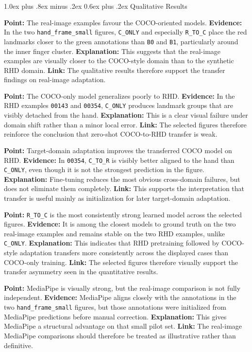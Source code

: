 \documentclass[10pt,letterpaper]{article}
\makeatletter
\renewcommand\subsection{\@startsection{subsection}{2}{\z@}%
  {1.0ex plus .8ex minus .2ex}%
  {0.6ex plus .2ex}%
  {\normalfont\itshape}}
\makeatother
\begin{document}
\subsection{Qualitative Results}

\medskip
\noindent\textbf{Point:} The real-image examples favour the COCO-oriented models.  
\textbf{Evidence:} In the two \texttt{hand\_frame\_small} figures, \texttt{C\_ONLY} and especially \texttt{R\_TO\_C} place the red landmarks closer to the green annotations than \texttt{B0} and \texttt{B1}, particularly around the inner finger cluster.  
\textbf{Explanation:} This suggests that the real-image examples are visually closer to the COCO-style domain than to the synthetic RHD domain.  
\textbf{Link:} The qualitative results therefore support the transfer findings on real-image adaptation.

\medskip
\noindent\textbf{Point:} The COCO-only model generalizes poorly to RHD.  
\textbf{Evidence:} In the RHD examples \texttt{00143} and \texttt{00354}, \texttt{C\_ONLY} produces landmark groups that are visibly detached from the hand.  
\textbf{Explanation:} This is a clear visual failure under domain shift rather than a minor local error.  
\textbf{Link:} The selected figures therefore reinforce the conclusion that zero-shot COCO-to-RHD transfer is weak.

\medskip
\noindent\textbf{Point:} Target-domain adaptation improves the transferred COCO model on RHD.  
\textbf{Evidence:} In \texttt{00354}, \texttt{C\_TO\_R} is visibly better aligned to the hand than \texttt{C\_ONLY}, even though it is not the strongest prediction in the figure.  
\textbf{Explanation:} Fine-tuning reduces the most obvious cross-domain failures, but does not eliminate them completely.  
\textbf{Link:} This supports the interpretation that transfer is useful mainly as initialization for later target-domain adaptation.

\medskip
\noindent\textbf{Point:} \texttt{R\_TO\_C} is the most consistently strong learned model across the selected figures.  
\textbf{Evidence:} It is among the closest models to ground truth on the two real-image examples and remains stable on the two RHD examples, unlike \texttt{C\_ONLY}.  
\textbf{Explanation:} This indicates that RHD pretraining followed by COCO-style adaptation transfers more consistently across the displayed cases than COCO-only training.  
\textbf{Link:} The selected figures therefore visually support the transfer asymmetry seen in the quantitative results.

\medskip
\noindent\textbf{Point:} MediaPipe is visually strong, but the real-image comparison is not fully independent.  
\textbf{Evidence:} MediaPipe aligns closely with the annotations in the two \texttt{hand\_frame\_small} figures, but those annotations were initialized from MediaPipe predictions before manual correction.  
\textbf{Explanation:} This gives MediaPipe a structural advantage on that small pilot set.  
\textbf{Link:} The real-image MediaPipe comparisons should therefore be treated as illustrative rather than definitive.
\end{document}
